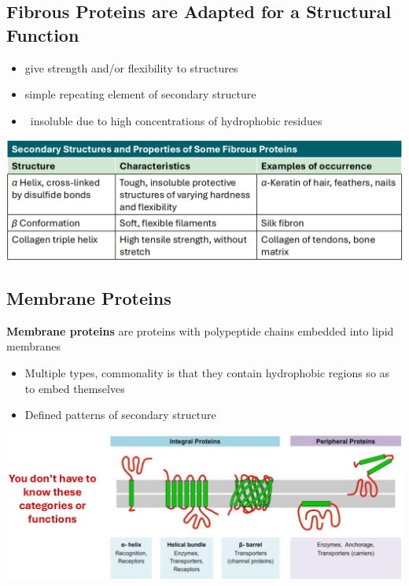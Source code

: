 \documentclass[10pt]{article}
\newcommand{\water}{\text{H$_2$O}}
\begin{document}
\subsection*{Fibrous Proteins are Adapted for a Structural Function}
\begin{itemize}
    \item give strength and/or flexibility to structures
    \item simple repeating element of secondary structure
    \item \water~insoluble due to high concentrations of hydrophobic residues
\end{itemize}
\begin{center}
    \includegraphics*[scale=0.4]{L1_7.png}
\end{center}

\subsection*{Membrane Proteins} 
\textbf{Membrane proteins} are proteins with polypeptide chains embedded into lipid membranes
\begin{itemize}
    \item Multiple types, commonality is that they contain hydrophobic regions so as to embed themselves
    \item Defined patterns of secondary structure
\end{itemize}
\begin{center}
    \includegraphics*[width=\textwidth]{L1_8.png}
\end{center}
\end{document}

